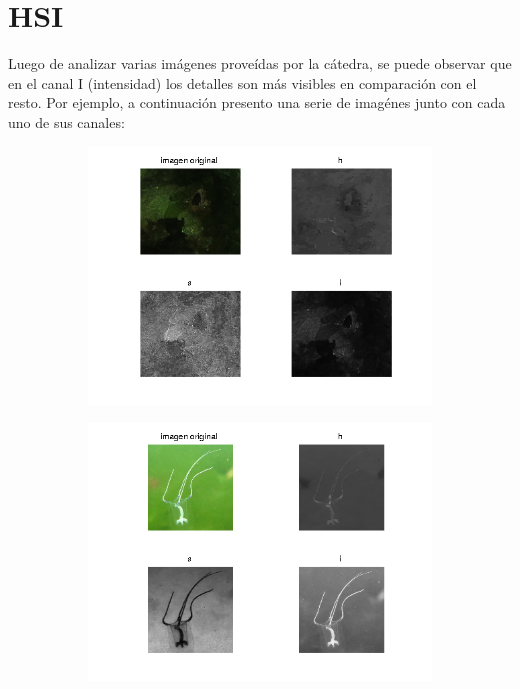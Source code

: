\documentclass{article}
\begin{document}
\section{HSI}

Luego de analizar varias imágenes proveídas por la cátedra, se puede observar que en el canal I (intensidad) los detalles son más visibles en comparación con el resto. Por ejemplo, a continuación presento una serie de imagénes junto con cada uno de sus canales:

\begin{figure}[H]
	\begin{subfigure}{0.5\textwidth}
	\centering
        \includegraphics[scale=0.6]{im3.png}
    \end{subfigure}\hfill
	\begin{subfigure}{0.5\textwidth}
	\centering
        \includegraphics[scale=0.6]{im4.png}

\end{subfigure}
\end{figure}
\end{document}
